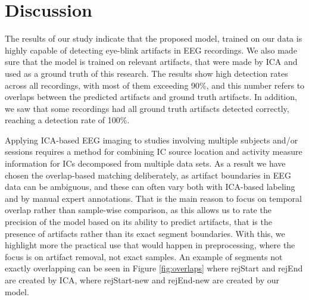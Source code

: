 \documentclass[12pt,a4paper,titlepage,openany]{report}
\begin{document}
\begin{table}[htbp]
\centering
{}
\caption{Artifact-level evaluation of model predictions with three residual blocks}
\label{tab:artifact_eval_3_blocks}
\end{table}

\section{Discussion}

The results of our study indicate that the proposed model, trained on our data is highly capable of detecting eye-blink artifacts in EEG recordings. We also made sure that the model is trained on relevant artifacts, that were made by ICA and used as a ground truth of this research. The results show high detection rates across all recordings, with most of them exceeding 90\%, and this number refers to overlaps between the predicted artifacts and ground truth artifacts. In addition, we saw that some recordings had all ground truth artifacts detected correctly, reaching a detection rate of 100\%.

Applying ICA-based EEG imaging to studies involving multiple subjects and/or sessions requires a method for combining IC source location and activity measure information for ICs decomposed from multiple data sets.\cite{bigdely2013measure} As a result we have chosen the overlap-based matching deliberately, as artifact boundaries in EEG data can be ambiguous, and these can often vary both with ICA-based labeling and by manual expert annotations. That is the main reason to focus on temporal overlap rather than sample-wise comparison, as this allows us to rate the precision of the model based on its ability to predict artifacts, that is the presence of artifacts rather than its exact segment boundaries. With this, we highlight more the practical use that would happen in preprocessing, where the focus is on artifact removal, not exact samples. An example of segments not exactly overlapping can be seen in Figure \ref{fig:overlaps} where rejStart and rejEnd are created by ICA, where rejStart-new and rejEnd-new are created by our model.
\end{document}
